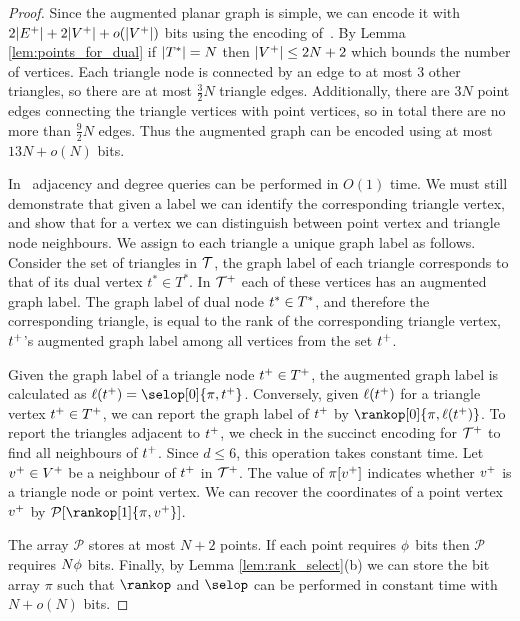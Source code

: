 {\begin{proof}
Since the augmented planar graph is simple, we can encode it with 
$2|E^+| + 2|V^+| + o(|V^+|)$ bits 
using the encoding of~\cite{DBLP:journals/siamcomp/ChiangLL05}. 
By Lemma \ref{lem:points_for_dual} if $|T^*| = N$ then 
$|V^+| \le 2N+2$ which bounds the number of vertices. 
Each triangle node is connected by an edge to at most $3$ 
other triangles, so there are at most $\frac{3}{2} N$ triangle edges. 
Additionally, there are $3N$ point edges connecting the 
triangle vertices with point vertices, so in total there are no 
more than $\frac{9}{2}N$ edges. 
Thus the augmented graph can be encoded using at most $13N + o(N)$ bits. 

In~\cite{DBLP:journals/siamcomp/ChiangLL05} adjacency and degree queries
 can be performed in $O(1)$ time. 
We must still demonstrate that given a label we can identify the corresponding 
triangle vertex, and show that for a vertex we can distinguish between point 
vertex and triangle node neighbours. 
We assign to each triangle a unique graph label as follows. 
Consider the set of triangles in $\mathcal{T}$, the graph label of each 
triangle corresponds to that of its dual vertex $t^* \in T^*$. 
In $\mathcal{T}^+$ each of these vertices has an augmented graph label.  
The graph label of dual node $t^* \in T^*$, and therefore the 
corresponding triangle, is equal to the rank of the corresponding 
triangle vertex, $t^+$'s augmented graph label among all 
vertices from the set $t^+$. 

Given the graph label of a triangle node $t^+ \in T^+$,
 the augmented graph label is calculated as $\ell(t^{\augdualsym}) = 
\selop[0]{\pi, \augdual{t}}$.
Conversely, given $\ell(t^+)$ for a triangle vertex 
$t^+ \in T^+$, we can report the graph label 
of $t^+$ by $\rankop[0]{\pi,\ell(\augdual{t})}$. 
To report the triangles adjacent to $t^+$, we check in 
the succinct encoding for $\mathcal{T}^+$ to find all neighbours of 
$t^+$. 
Since $d \le 6$, this operation takes constant time. 
Let $v^+ \in V^+$ be a neighbour of $t^+$ in 
$\mathcal{T}^+$. 
The value of $\pi[v^+]$ indicates whether $v^+$ is a 
triangle node or point vertex. 
We can recover the coordinates of a point vertex $v^+$ by 
$\mathcal{P}[\rankop[1]{\pi,\augdual{v}}]$.

The array $\mathcal{P}$ stores at most $N+2$ points. 
If each point requires $\phi$ bits then $\mathcal{P}$ 
requires $N\phi$ bits. 
Finally, by Lemma \ref{lem:rank_select}(b) we can store the bit array 
$\pi$ such that $\rankop$ and $\selop$ can be performed in constant time 
with $N + o(N)$ bits.
\end{proof}

}

